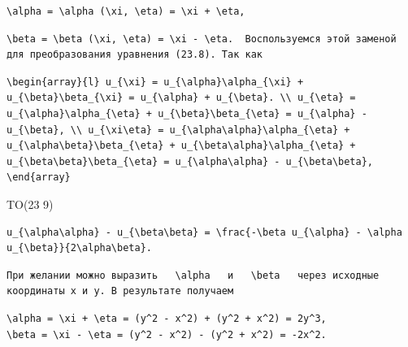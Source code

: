 \documentclass[
  ukrainian,
]{article}
\begin{document}
\begin{verbatim}
\alpha = \alpha (\xi, \eta) = \xi + \eta,
\end{verbatim}

\begin{verbatim}
\beta = \beta (\xi, \eta) = \xi - \eta.  Воспользуемся этой заменой для преобразования уравнения (23.8). Так как
\end{verbatim}

\begin{verbatim}
\begin{array}{l} u_{\xi} = u_{\alpha}\alpha_{\xi} + u_{\beta}\beta_{\xi} = u_{\alpha} + u_{\beta}. \\ u_{\eta} = u_{\alpha}\alpha_{\eta} + u_{\beta}\beta_{\eta} = u_{\alpha} - u_{\beta}, \\ u_{\xi\eta} = u_{\alpha\alpha}\alpha_{\eta} + u_{\alpha\beta}\beta_{\eta} + u_{\beta\alpha}\alpha_{\eta} + u_{\beta\beta}\beta_{\eta} = u_{\alpha\alpha} - u_{\beta\beta}, \end{array}
\end{verbatim}

TO(23 9)

\begin{verbatim}
u_{\alpha\alpha} - u_{\beta\beta} = \frac{-\beta u_{\alpha} - \alpha u_{\beta}}{2\alpha\beta}.
\end{verbatim}

\begin{verbatim}
При желании можно выразить   \alpha   и   \beta   через исходные координаты x и y. В результате получаем
\end{verbatim}

\begin{verbatim}
\alpha = \xi + \eta = (y^2 - x^2) + (y^2 + x^2) = 2y^3,
\beta = \xi - \eta = (y^2 - x^2) - (y^2 + x^2) = -2x^2.
\end{verbatim}
\end{document}
